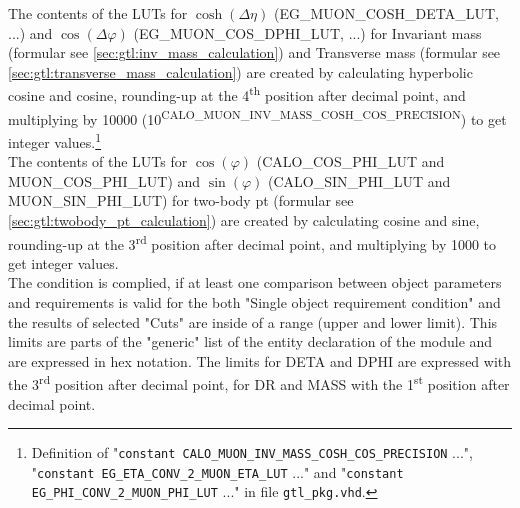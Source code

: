 The contents of the LUTs for $\cosh(\Delta\eta)$ (\small{EG\_MUON\_COSH\_DETA\_LUT}\normalsize, ...) and $\cos(\Delta\varphi)$ (\small{EG\_MUON\_COS\_DPHI\_LUT}\normalsize, ...) for Invariant mass
(formular see \ref{sec:gtl:inv_mass_calculation}) and Transverse mass (formular see \ref{sec:gtl:transverse_mass_calculation}) are created by calculating hyperbolic cosine and cosine, 
rounding-up at the 4\textsuperscript{th} position after decimal point, and multiplying by 10000
(10\textsuperscript{\tiny{CALO\_MUON\_INV\_MASS\_COSH\_COS\_PRECISION}}\normalsize) to get integer values.\footnote{Definition of "\texttt{constant \small{CALO\_MUON\_INV\_MASS\_COSH\_COS\_PRECISION}\normalsize} ...",
"\texttt{constant \small{EG\_ETA\_CONV\_2\_MUON\_ETA\_LUT}\normalsize} ..." and "\texttt{constant \small{EG\_PHI\_CONV\_2\_MUON\_PHI\_LUT}\normalsize} ..." in file \texttt{gtl\_pkg.vhd}.}\\
The contents of the LUTs for $\cos(\varphi)$ (\small{CALO\_COS\_PHI\_LUT and MUON\_COS\_PHI\_LUT}\normalsize) and $\sin(\varphi)$ (\small{CALO\_SIN\_PHI\_LUT and MUON\_SIN\_PHI\_LUT}\normalsize) for two-body pt 
(formular see \ref{sec:gtl:twobody_pt_calculation}) are created by calculating cosine and sine, rounding-up at the 3\textsuperscript{rd} position after decimal point,
and multiplying by 1000 to get integer values.\\
The condition is complied, if at least one comparison between object parameters and requirements is valid for the both "Single object requirement condition" and the results of selected "Cuts" are inside of
a range (upper and lower limit). This limits are parts of the "generic" list of the entity declaration of the module and are expressed in hex notation. The limits for DETA and DPHI
are expressed with the 3\textsuperscript{rd} position after decimal point, for DR and MASS with the 1\textsuperscript{st} position after decimal point.

